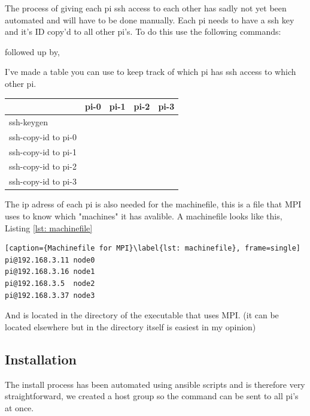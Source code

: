 The process of giving each pi ssh access to each other has sadly not yet been automated and will have to be done manually. Each pi needs to have a ssh key and it's ID copy'd to all other pi's. To do this use the following commands:


followed up by,



I've made a table you can use to keep track of which pi has ssh access to which other pi.
\begin{table}[h!]
\centering
\begin{tabular}{l|l|l|l|l|}
\cline{2-5}
                                          & pi-0 & pi-1 & pi-2 & pi-3 \\ \hline
\multicolumn{1}{|l|}{ssh-keygen}          &      &      &      &      \\ \hline
\multicolumn{1}{|l|}{ssh-copy-id to pi-0} &      &      &      &      \\ \hline
\multicolumn{1}{|l|}{ssh-copy-id to pi-1} &      &      &      &      \\ \hline
\multicolumn{1}{|l|}{ssh-copy-id to pi-2} &      &      &      &      \\ \hline
\multicolumn{1}{|l|}{ssh-copy-id to pi-3} &      &      &      &      \\ \hline
\end{tabular}
\end{table}

The ip adress of each pi is also needed for the machinefile, this is a file that MPI uses to know which "machines" it has avalible. 
A machinefile looks like this, Listing \ref{lst: machinefile}

\begin{lstlisting}[caption={Machinefile for MPI}\label{lst: machinefile}, frame=single]
pi@192.168.3.11 node0
pi@192.168.3.16 node1
pi@192.168.3.5  node2
pi@192.168.3.37 node3
\end{lstlisting}

And is located in the directory of the executable that uses MPI. (it can be located elsewhere but in the directory itself is easiest in my opinion) 

\subsection{Installation}

The install process has been automated using ansible scripts and is therefore very straightforward, we created a host group so the command can be sent to all pi's at once. 

